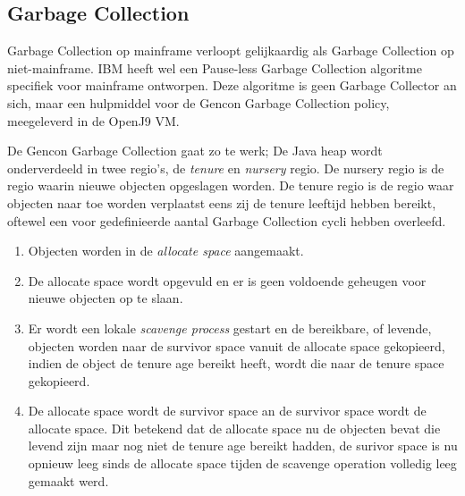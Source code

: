 \subsection{Garbage Collection}
\label{sec:mainframe garbage collection}
Garbage Collection op mainframe verloopt gelijkaardig als Garbage Collection op niet-mainframe.
IBM heeft wel een Pause-less Garbage Collection algoritme specifiek voor mainframe ontworpen.
Deze algoritme is geen Garbage Collector an sich, maar een hulpmiddel voor de Gencon Garbage Collection policy, meegeleverd in de OpenJ9 VM.


De Gencon Garbage Collection gaat zo te werk;
De Java heap wordt onderverdeeld in twee regio's, de \textit{tenure} en \textit{nursery} regio.
De nursery regio is de regio waarin nieuwe objecten opgeslagen worden.
De tenure regio is de regio waar objecten naar toe worden verplaatst eens zij de tenure leeftijd hebben bereikt, oftewel een voor gedefinieerde aantal Garbage Collection cycli hebben overleefd. 

\begin{enumerate}
    \item Objecten worden in de \textit{allocate space} aangemaakt.
    \item De allocate space wordt opgevuld en er is geen voldoende geheugen voor nieuwe objecten op te slaan.
    \item Er wordt een lokale \textit{scavenge process} gestart en de bereikbare, of levende, objecten worden naar de survivor space vanuit de allocate space gekopieerd, indien de object de tenure age bereikt heeft, wordt die naar de tenure space gekopieerd.
    \item De allocate space wordt de survivor space an de survivor space wordt de allocate space.
     Dit betekend dat de allocate space nu de objecten bevat die levend zijn maar nog niet de tenure age bereikt hadden,
     de surivor space is nu opnieuw leeg sinds de allocate space tijden de scavenge operation volledig leeg gemaakt werd.
\end{enumerate}


